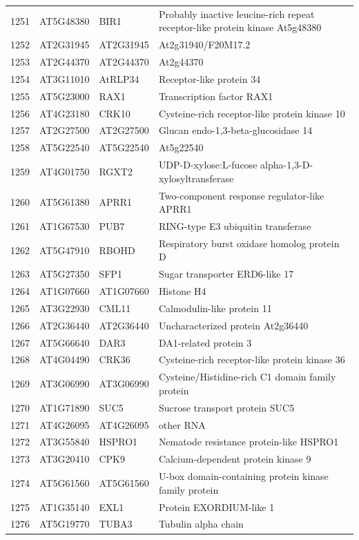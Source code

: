 \documentclass[11pt]{article}
\begin{document}
\begin{center}
\begin{tabular}{rlll}
1251 & AT5G48380 & BIR1 & Probably inactive leucine-rich repeat receptor-like protein kinase At5g48380\\
1252 & AT2G31945 & AT2G31945 & At2g31940/F20M17.2\\
1253 & AT2G44370 & AT2G44370 & At2g44370\\
1254 & AT3G11010 & AtRLP34 & Receptor-like protein 34\\
1255 & AT5G23000 & RAX1 & Transcription factor RAX1\\
1256 & AT4G23180 & CRK10 & Cysteine-rich receptor-like protein kinase 10\\
1257 & AT2G27500 & AT2G27500 & Glucan endo-1,3-beta-glucosidase 14\\
1258 & AT5G22540 & AT5G22540 & At5g22540\\
1259 & AT4G01750 & RGXT2 & UDP-D-xylose:L-fucose alpha-1,3-D-xylosyltransferase\\
1260 & AT5G61380 & APRR1 & Two-component response regulator-like APRR1\\
1261 & AT1G67530 & PUB7 & RING-type E3 ubiquitin transferase\\
1262 & AT5G47910 & RBOHD & Respiratory burst oxidase homolog protein D\\
1263 & AT5G27350 & SFP1 & Sugar transporter ERD6-like 17\\
1264 & AT1G07660 & AT1G07660 & Histone H4\\
1265 & AT3G22930 & CML11 & Calmodulin-like protein 11\\
1266 & AT2G36440 & AT2G36440 & Uncharacterized protein At2g36440\\
1267 & AT5G66640 & DAR3 & DA1-related protein 3\\
1268 & AT4G04490 & CRK36 & Cysteine-rich receptor-like protein kinase 36\\
1269 & AT3G06990 & AT3G06990 & Cysteine/Histidine-rich C1 domain family protein\\
1270 & AT1G71890 & SUC5 & Sucrose transport protein SUC5\\
1271 & AT4G26095 & AT4G26095 & other RNA\\
1272 & AT3G55840 & HSPRO1 & Nematode resistance protein-like HSPRO1\\
1273 & AT3G20410 & CPK9 & Calcium-dependent protein kinase 9\\
1274 & AT5G61560 & AT5G61560 & U-box domain-containing protein kinase family protein\\
1275 & AT1G35140 & EXL1 & Protein EXORDIUM-like 1\\
1276 & AT5G19770 & TUBA3 & Tubulin alpha chain\\

\end{tabular}
\end{center}
\end{document}

